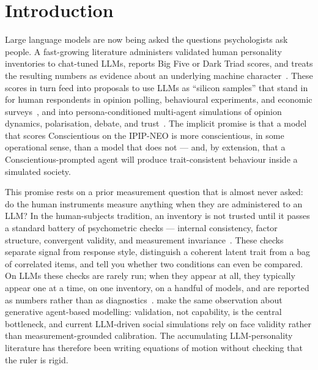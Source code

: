 \documentclass[11pt]{article}
\begin{document}
\section{Introduction}
\label{sec:intro}

Large language models are now being asked the questions psychologists ask people. A fast-growing literature administers validated human personality inventories to chat-tuned LLMs, reports Big Five or Dark Triad scores, and treats the resulting numbers as evidence about an underlying machine character~\citep{miotto2023gpt3,serapio2025psychometric,jiang2023personallm,huang2023psychobench,bodroza2024personality}. These scores in turn feed into proposals to use LLMs as ``silicon samples'' that stand in for human respondents in opinion polling, behavioural experiments, and economic surveys~\citep{argyle2023one,horton2023homo,aher2023using,park2023generative,ferreira2025matching}, and into persona-conditioned multi-agent simulations of opinion dynamics, polarisation, debate, and trust~\citep{chuang2023simulating,cau2025language,chuang2025debate,mannekote2025roleplaying}. The implicit promise is that a model that scores Conscientious on the IPIP-NEO is more conscientious, in some operational sense, than a model that does not --- and, by extension, that a Conscientious-prompted agent will produce trait-consistent behaviour inside a simulated society.

This promise rests on a prior measurement question that is almost never asked: do the human instruments measure anything when they are administered to an LLM? In the human-subjects tradition, an inventory is not trusted until it passes a standard battery of psychometric checks --- internal consistency, factor structure, convergent validity, and measurement invariance~\citep{cronbach1951coefficient,kaiser1960application,vandenberg2000review}. These checks separate signal from response style, distinguish a coherent latent trait from a bag of correlated items, and tell you whether two conditions can even be compared. On LLMs these checks are rarely run; when they appear at all, they typically appear one at a time, on one inventory, on a handful of models, and are reported as numbers rather than as diagnostics~\citep{suhr2025challenging,pelet2025persistent,schaekermann2024personality}. \citet{larooij2025validation} make the same observation about generative agent-based modelling: validation, not capability, is the central bottleneck, and current LLM-driven social simulations rely on face validity rather than measurement-grounded calibration. The accumulating LLM-personality literature has therefore been writing equations of motion without checking that the ruler is rigid.
\end{document}
